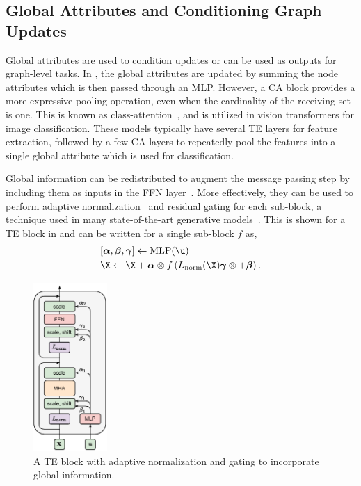 \subsection{Global Attributes and Conditioning Graph Updates}
\label{sec:global_attributes}

Global attributes are used to condition updates or can be used as outputs for graph-level tasks.
In , the global attributes are updated by summing the node attributes which is then passed through an MLP\@.
However, a CA block provides a more expressive pooling operation, even when the cardinality of the receiving set is one.
This is known as class-attention~\cite{GoingDeeper}, and is utilized in vision transformers for image classification.
These models typically have several TE layers for feature extraction, followed by a few CA layers to repeatedly pool the features into a single global attribute which is used for classification.

Global information can be redistributed to augment the message passing step by including them as inputs in the FFN layer~\cite{PCJedi}.
More effectively, they can be used to perform adaptive normalization~\cite{FiLMVisualReasoning} and residual gating for each sub-block, a technique used in many state-of-the-art generative models~\cite{SD3, DIT, flux2024github}.
This is shown for a TE block in  and can be written for a single sub-block $f$ as,
\begin{equation}
    \begin{aligned}
    & [\boldsymbol{\alpha}, \boldsymbol{\beta}, \boldsymbol{\gamma}] \leftarrow \text{MLP}(\u) \\
    & \X \leftarrow \X + \boldsymbol{\alpha} \otimes f \left(L_\text{norm}(\X)\boldsymbol{\gamma} \otimes  + \boldsymbol{\beta}\right).
    \end{aligned}
\end{equation}

\begin{figure}
    \centering
    \includegraphics[width=0.25\textwidth]{Figures/graph_networks/adaptivegating.pdf}
    \caption{A TE block with adaptive normalization and gating to incorporate global information.}
    \label{fig:adaptive_gating}
\end{figure}
